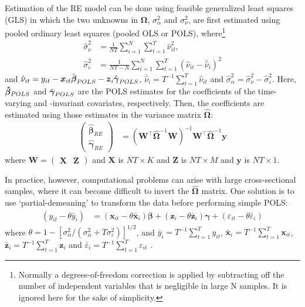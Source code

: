 \documentclass[]{interact}
\theoremstyle{plain}%
\theoremstyle{definition}
\theoremstyle{remark}
\begin{document}
Estimation of the RE model can be done using feasible generalized least
squares (GLS) in which the two unknowns in \(\bm{\Omega}\),
\(\sigma_{\alpha}^{2}\) and \(\sigma_{\nu}^{2}\), are first estimated
using pooled ordinary least squares (pooled OLS or POLS),
where\footnote{Normally a degrees-of-freedom correction is applied by
  subtracting off the number of independent variables that is negligible
  in large N samples. It is ignored here for the sake of simplicity.}
\begin{align}
\hat{\sigma}_{\nu}^{2} & = \frac{1}{NT}\sum_{i = 1}^{N}\sum_{t = 1}^{T}\hat{\nu}_{it}^{2}, \\
\hat{\sigma}_{\varepsilon}^{2} & = \frac{1}{NT - N}\sum_{i = 1}^{N}\sum_{t = 1}^{T}(\hat{\nu}_{it} - \bar{\hat{\nu}}_{i})^{2}
\end{align} and
\(\hat{\nu}_{it} = y_{it} - \bm{x}_{it}\hat{\bm{\beta}}_{\tiny{POLS}} - \bm{z}_{i}\hat{\bm{\gamma}}_{\tiny{POLS}}\),
\(\bar{\hat{\nu}}_{i} = T^{-1}\sum_{t = 1}^{T}\hat{\nu}_{it}\) and
\(\hat{\sigma}^{2}_{\alpha} = \hat{\sigma}^{2}_{\nu} - \hat{\sigma}^{2}_{\varepsilon}\).
Here, \(\bm{\hat{\beta}}_{\tiny{POLS}}\) and
\(\hat{\bm{\gamma}}_{\tiny{POLS}}\) are the POLS estimates for the
coefficients of the time-varying and -invariant covariates,
respectively. Then, the coefficients are estimated using those estimates
in the variance matrix \(\hat{\bm{\Omega}}\): \begin{align}
\begin{pmatrix}
\hat{\bm{\beta}}_{RE} \\
\hat{\bm{\gamma}}_{RE}
\end{pmatrix} & = 
(\bm{W}^{\intercal}\hat{\bm{\Omega}}^{-1}\bm{W})^{-1}\bm{W}^{\intercal}\hat{\bm{\Omega}}^{-1}\bm{y}
\end{align} where
\(\bm{W} = \begin{pmatrix}\bm{X} & \bm{Z}\end{pmatrix}\) and \(\bm{X}\)
is \(NT \times K\) and \(\bm{Z}\) is \(NT \times M\) and \(\bm{y}\) is
\(NT \times 1\).

In practice, however, computational problems can arise with large
cross-sectional samples, where it can become difficult to invert the
\(\hat{\bm{\Omega}}\) matrix. One solution is to use `partial-demeaning'
to transform the data before performing simple POLS: \begin{align}
(y_{it} - \theta\bar{y}_{i}) & = (\bm{x}_{it} - \theta\bar{\bm{x}}_{i})\bm{\beta} + (\bm{z}_{i} - \theta \bar{\bm{z}}_{i})\bm{\gamma} + (\varepsilon_{it} - \theta \bar{\varepsilon}_{i}) \label{eq:partialdemean}
\end{align} where
\(\theta = 1 - [\sigma_{\alpha}^{2}/(\sigma_{\alpha}^{2} + T \sigma_{\varepsilon}^{2})]^{1/2}\),
and \(\bar{y}_{i} = T^{-1}\sum_{t = 1}^{T}y_{it}\),
\(\bar{\bm{x}}_{i} = T^{-1}\sum_{t = 1}^{T}\bm{x}_{it}\),
\(\bar{\bm{z}}_{i} = T^{-1}\sum_{t = 1}^{T}\bm{z}_{i}\) and
\(\bar{\varepsilon}_{i} = T^{-1}\sum_{t = 1}^{T}\varepsilon_{it}\)
\citep{R-plm_a}.
\end{document}
